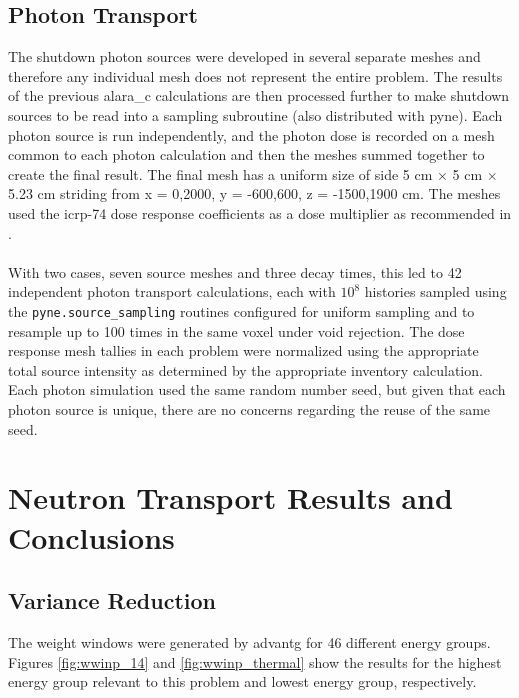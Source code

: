 \documentclass[12pt]{article}
\begin{document}
\subsection{Photon Transport}
The shutdown photon sources were developed in several separate meshes and
therefore any individual mesh does not represent the entire problem. The
results of the previous \gls{alara_c} calculations are then processed further
to make shutdown sources to be read into a sampling subroutine (also distributed
with \gls{pyne}). Each photon source is run independently, and the photon dose
is recorded on a mesh common to each photon calculation and then the meshes
summed together to create the final result. The final mesh has a uniform size of
side 5 cm $\times$ 5 cm $\times$ 5.23 cm striding from x = {0,2000}, y = {-600,600},
 z = {-1500,1900} cm. The meshes used the \gls{icrp}-74 dose response coefficients 
as a dose multiplier as recommended in \cite{iter_sdr_coeffs}.
\\
\\

With two cases, seven source meshes and three decay times, this led to 42
independent photon transport calculations, each with $10^8$ histories sampled
using the \texttt{pyne.source\_sampling} routines configured for uniform
sampling and to resample up to 100 times in the same voxel under void rejection.  
The dose response mesh
tallies in each problem were normalized using the appropriate total source
intensity as determined by the appropriate inventory calculation.  Each photon
simulation used the same random number seed, but given that each photon source
is unique, there are no concerns regarding the reuse of the same seed.

\newpage
\clearpage
\section{Neutron Transport Results and Conclusions}

\subsection{Variance Reduction}
The weight windows were generated by \gls{advantg} for 46 different energy groups.  
Figures \ref{fig:wwinp_14} and \ref{fig:wwinp_thermal} show the results for the highest
energy group relevant to this problem and lowest energy group, respectively.
\end{document}
